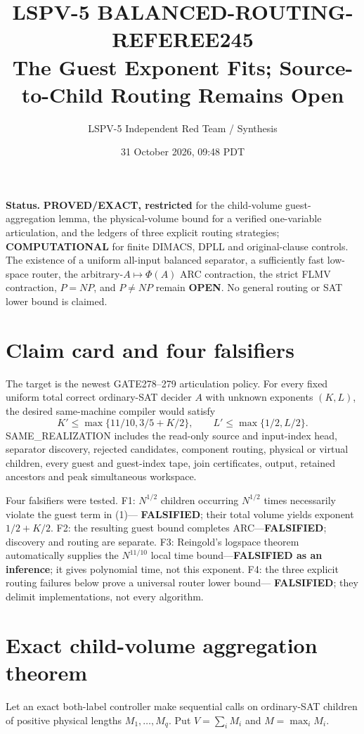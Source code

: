 \documentclass[11pt]{article}
\title{LSPV-5 BALANCED-ROUTING-REFEREE245\\
The Guest Exponent Fits; Source-to-Child Routing Remains Open}
\author{LSPV-5 Independent Red Team / Synthesis}
\date{31 October 2026, 09:48 PDT}
\begin{document}
\maketitle

\noindent\textbf{Status.}
\textbf{PROVED/EXACT, restricted} for the child-volume guest-aggregation
lemma, the physical-volume bound for a verified one-variable articulation,
and the ledgers of three explicit routing strategies; \textbf{COMPUTATIONAL}
for finite DIMACS, DPLL and original-clause controls.  The existence of a
uniform all-input balanced separator, a sufficiently fast low-space router,
the arbitrary-$A\mapsto\Phi(A)$ ARC contraction, the strict FLMV contraction,
$P=NP$, and $P\ne NP$ remain \textbf{OPEN}.  No general routing or SAT lower
bound is claimed.

\section{Claim card and four falsifiers}
The target is the newest GATE278--279 articulation policy.  For every fixed
uniform total correct ordinary-SAT decider $A$ with unknown exponents $(K,L)$,
the desired same-machine compiler would satisfy
\[
 K'\le\max\{11/10,3/5+K/2\},\qquad
 L'\le\max\{1/2,L/2\}.                              \tag{1}
\]
SAME\_REALIZATION includes the read-only source and input-index head,
separator discovery, rejected candidates, component routing, physical or
virtual children, every guest and guest-index tape, join certificates, output,
retained ancestors and peak simultaneous workspace.

Four falsifiers were tested.  F1: $N^{1/2}$ children occurring
$N^{1/2}$ times necessarily violate the guest term in (1)---
\textbf{FALSIFIED}; their total volume yields exponent $1/2+K/2$.
F2: the resulting guest bound completes ARC---\textbf{FALSIFIED}; discovery
and routing are separate.  F3: Reingold's logspace theorem automatically
supplies the $N^{11/10}$ local time bound---\textbf{FALSIFIED as an
inference}; it gives polynomial time, not this exponent.  F4: the three
explicit routing failures below prove a universal router lower bound---
\textbf{FALSIFIED}; they delimit implementations, not every algorithm.

\section{Exact child-volume aggregation theorem}
Let an exact both-label controller make sequential calls on ordinary-SAT
children of positive physical lengths $M_1,\ldots,M_q$.  Put
$V=\sum_iM_i$ and $M=\max_iM_i$.
\end{document}
